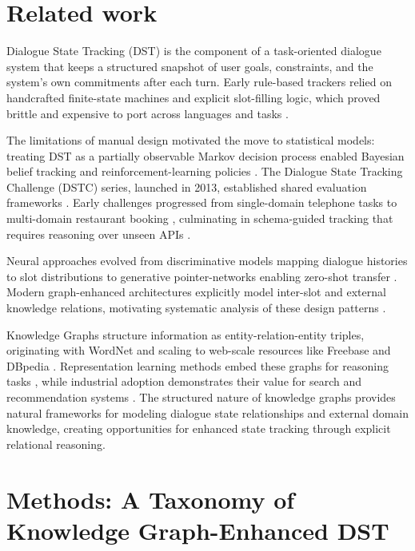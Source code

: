 \documentclass[11pt]{article}
\begin{document}
\section{Related work}
Dialogue State Tracking (DST) is the component of a task-oriented dialogue system that keeps a structured snapshot of user goals, constraints, and the system’s own commitments after each turn. Early rule-based trackers relied on handcrafted finite-state machines and explicit slot-filling logic, which proved brittle and expensive to port across languages and tasks \citep{paek2008automating}.

The limitations of manual design motivated the move to statistical models: treating DST as a partially observable Markov decision process enabled Bayesian belief tracking and reinforcement-learning policies \citep{young2013pomdp}. The Dialogue State Tracking Challenge (DSTC) series, launched in 2013, established shared evaluation frameworks \citep{williams2016dialog}. Early challenges progressed from single-domain telephone tasks \citep{williams2013dstc} to multi-domain restaurant booking \citep{henderson2014dstc2}, culminating in schema-guided tracking that requires reasoning over unseen APIs \citep{kim2019dstc8}.

Neural approaches evolved from discriminative models mapping dialogue histories to slot distributions \citep{henderson2014word} to generative pointer-networks enabling zero-shot transfer \citep{wu2019transferable}. Modern graph-enhanced architectures explicitly model inter-slot and external knowledge relations, motivating systematic analysis of these design patterns \citep{Chen2020SST,lin-etal-2021-knowledge,li2025advanced}.

Knowledge Graphs structure information as entity-relation-entity triples, originating with WordNet \citep{miller1995wordnet} and scaling to web-scale resources like Freebase and DBpedia \citep{bollacker2008freebase,lehmann2015dbpedia}. Representation learning methods embed these graphs for reasoning tasks \citep{bordes2013translating,sun2019rotate}, while industrial adoption demonstrates their value for search and recommendation systems \citep{singhal2012knowledgegraph}. The structured nature of knowledge graphs provides natural frameworks for modeling dialogue state relationships and external domain knowledge, creating opportunities for enhanced state tracking through explicit relational reasoning.

\section{Methods: A Taxonomy of Knowledge Graph-Enhanced DST}
\end{document}
